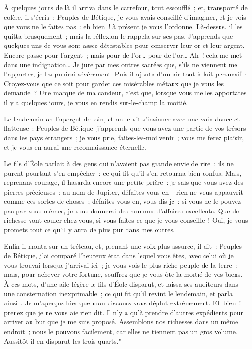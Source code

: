 \documentclass[french,twoside]{book} %
\begin{document}
À quelques jours de là il arriva dans le carrefour, tout essoufflé ; et, transporté de colère, il s’écria : Peuples de Bétique, je vous avais conseillé d’imaginer, et je vois que vous ne le faites pas : eh bien ! à présent je vous l’ordonne. Là-dessus, il les quitta brusquement ; mais la réflexion le rappela sur ses pas. J’apprends que quelques-uns de vous sont assez détestables pour conserver leur or et leur argent. Encore passe pour l’argent ; mais pour de l’or… pour de l’or… Ah ! cela me met dans une indignation… Je jure par mes outres sacrées que, s’ils ne viennent me l’apporter, je les punirai sévèrement. Puis il ajouta d’un air tout à fait persuasif : Croyez-vous que ce soit pour garder ces misérables métaux que je vous les demande ? Une marque de ma candeur, c’est que, lorsque vous me les apportâtes il y a quelques jours, je vous en rendis sur-le-champ la moitié.\par
Le lendemain on l’aperçut de loin, et on le vit s’insinuer avec une voix douce et flatteuse : Peuples de Bétique, j’apprends que vous avez une partie de vos trésors dans les pays étrangers ; je vous prie, faites-les-moi venir ; vous me ferez plaisir, et je vous en aurai une reconnaissance éternelle.\par
Le fils d’Éole parlait à des gens qui n’avaient pas grande envie de rire ; ils ne purent pourtant s’en empêcher : ce qui fit qu’il s’en retourna bien confus. Mais, reprenant courage, il hasarda encore une petite prière : je sais que vous avez des pierres précieuses ; au nom de Jupiter, défaites-vous-en : rien ne vous appauvrit comme ces sortes de choses ; défaites-vous-en, vous dis-je : si vous ne le pouvez pas par vous-mêmes, je vous donnerai des hommes d’affaires excellents. Que de richesse vont couler chez vous, si vous faites ce que je vous conseille ! Oui, je vous promets tout ce qu’il y aura de plus pur dans mes outres.\par
Enfin il monta sur un tréteau, et, prenant une voix plus assurée, il dit : Peuples de Bétique, j’ai comparé l’heureux état dans lequel vous êtes, avec celui où je vous trouvai lorsque j’arrivai ici ; je vous vois le plus riche peuple de la terre : mais, pour achever votre fortune, souffrez que je vous ôte la moitié de vos biens. À ces mots, d’une aile légère le fils d’Éole disparut, et laissa ses auditeurs dans une consternation inexprimable ; ce qui fit qu’il revint le lendemain, et parla ainsi : Je m’aperçus hier que mon discours vous déplut extrêmement. Eh bien ! prenez que je ne vous aie rien dit. Il n’y a qu’à prendre d’autres expédients pour arriver au but que je me suis proposé. Assemblons nos richesses dans un même endroit ; nous le pouvons facilement, car elles ne tiennent pas un gros volume. Aussitôt il en disparut les trois quarts."\par
\end{document}
